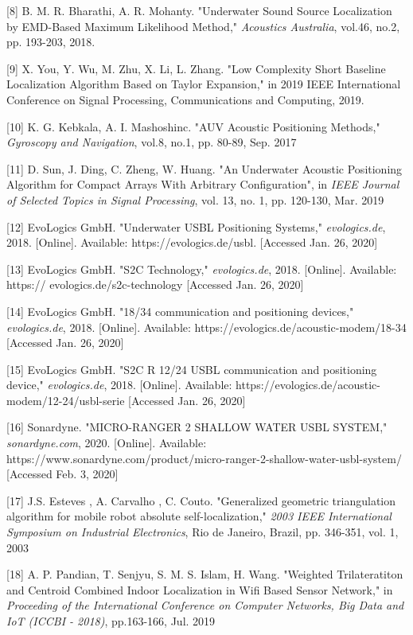 [8] B. M. R. Bharathi, A. R. Mohanty. "Underwater Sound Source Localization by EMD-Based Maximum Likelihood Method," \textit{Acoustics Australia}, vol.46, no.2, pp. 193-203, 2018.
\label{r:crosscorr}

[9] X. You, Y. Wu, M. Zhu, X. Li, L. Zhang. "Low Complexity Short Baseline Localization Algorithm Based on Taylor Expansion," in 2019 IEEE International Conference on Signal Processing, Communications and Computing, 2019.
\label{r:sbl}

[10] K. G. Kebkala, A. I. Mashoshinc. "AUV Acoustic Positioning Methods," \textit{Gyroscopy and Navigation}, vol.8, no.1, pp. 80-89, Sep. 2017
\label{r:lblsblusbl}

[11] D. Sun, J. Ding, C. Zheng, W. Huang. "An Underwater Acoustic Positioning Algorithm for Compact Arrays With Arbitrary Configuration", in \textit{IEEE Journal of Selected Topics in Signal Processing}, vol. 13, no. 1, pp. 120-130, Mar. 2019
\label{r:usbl-new}

[12] EvoLogics GmbH. "Underwater USBL Positioning Systems," \textit{evologics.de}, 2018. [Online]. Available: https://evologics.de/usbl. [Accessed Jan. 26, 2020]
\label{r:evologics1}

[13] EvoLogics GmbH. "S2C Technology," \textit{evologics.de}, 2018. [Online]. Available: https://
evologics.de/s2c-technology [Accessed Jan. 26, 2020]
\label{r:evologics2}

[14] EvoLogics GmbH. "18/34 communication and positioning devices," \textit{evologics.de}, 2018. [Online]. Available: https://evologics.de/acoustic-modem/18-34 [Accessed Jan. 26, 2020]
\label{r:evologics3}

[15] EvoLogics GmbH. "S2C R 12/24 USBL communication and positioning device," \textit{evologics.de}, 2018. [Online]. Available: https://evologics.de/acoustic-modem/12-24/usbl-serie [Accessed Jan. 26, 2020]
\label{r:evologics4}

[16] Sonardyne. "MICRO-RANGER 2 SHALLOW WATER USBL SYSTEM," \textit{sonardyne.com}, 2020. [Online]. Available: https://www.sonardyne.com/product/micro-ranger-2-shallow-water-usbl-system/ [Accessed Feb. 3, 2020]
\label{r:sonardyne1}

[17] J.S. Esteves , A. Carvalho , C. Couto. "Generalized geometric triangulation algorithm for mobile robot absolute self-localization,"\textit{ 2003 IEEE International Symposium on Industrial Electronics}, Rio de Janeiro, Brazil, pp. 346-351, vol. 1, 2003
\label{r:triangalgo}

[18] A. P. Pandian, T. Senjyu, S. M. S. Islam, H. Wang. "Weighted Trilateratiton and Centroid Combined Indoor Localization in Wifi Based Sensor Network," in \textit{Proceeding of the International Conference on Computer Networks, Big Data and IoT (ICCBI - 2018)}, pp.163-166, Jul. 2019
\label{r:trilat}

